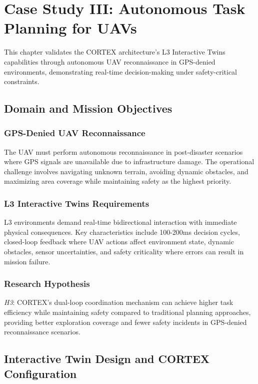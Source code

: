 
\chapter{Case Study III: Autonomous Task Planning for UAVs} \label{chp:uav}

This chapter validates the CORTEX architecture's L3 Interactive Twins capabilities through autonomous UAV reconnaissance in GPS-denied environments, demonstrating real-time decision-making under safety-critical constraints.

\section{Domain and Mission Objectives}

\subsection{GPS-Denied UAV Reconnaissance}

The UAV must perform autonomous reconnaissance in post-disaster scenarios where GPS signals are unavailable due to infrastructure damage. The operational challenge involves navigating unknown terrain, avoiding dynamic obstacles, and maximizing area coverage while maintaining safety as the highest priority.

\subsection{L3 Interactive Twins Requirements}

L3 environments demand real-time bidirectional interaction with immediate physical consequences. Key characteristics include 100-200ms decision cycles, closed-loop feedback where UAV actions affect environment state, dynamic obstacles, sensor uncertainties, and safety criticality where errors can result in mission failure.

\subsection{Research Hypothesis}

\emph{H3}: CORTEX's dual-loop coordination mechanism can achieve higher task efficiency while maintaining safety compared to traditional planning approaches, providing better exploration coverage and fewer safety incidents in GPS-denied reconnaissance scenarios.

\section{Interactive Twin Design and CORTEX Configuration}

